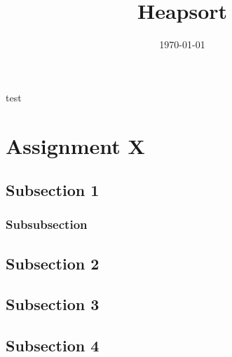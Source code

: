\documentclass[a4paper,10pt]{article}
\title{Heapsort}
\author{}
\date{\today}
\begin{document}
\maketitle
\pagebreak
\tableofcontents
\pagebreak
test
\section{Assignment X}

\subsection{Subsection 1}

\subsubsection{Subsubsection}


\subsection{Subsection 2}



\subsection{Subsection 3}



\subsection{Subsection 4}
\end{document}
